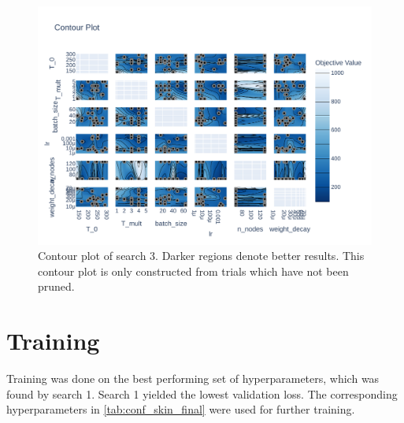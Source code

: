 \begin{figure}
    \centering
    \includegraphics[angle=90,width=0.9\textheight, height=\linewidth,keepaspectratio]{skinstression/images/hyperparameter-search/search-3/contour.pdf}
    \caption[Search 3 contour plot]{
        Contour plot of search 3.
        Darker regions denote better results.
        This contour plot is only constructed from trials which have not been pruned.
    }
    \label{fig:skinstression-search3-contour}
\end{figure}

\section{Training}
Training was done on the best performing set of hyperparameters, which was found by search 1.
Search 1 yielded the lowest validation loss.
The corresponding hyperparameters in \cref{tab:conf_skin_final} were used for further training.

